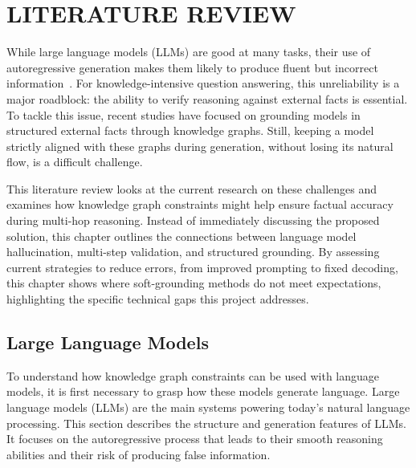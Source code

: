 
\chapter{LITERATURE REVIEW}


While large language models (LLMs) are good at many tasks, their use of autoregressive generation makes them likely to produce fluent but incorrect information~\citep{ji2023survey}. For knowledge-intensive question answering, this unreliability is a major roadblock: the ability to verify reasoning against external facts is essential. To tackle this issue, recent studies have focused on grounding models in structured external facts through knowledge graphs. Still, keeping a model strictly aligned with these graphs during generation, without losing its natural flow, is a difficult challenge.

This literature review looks at the current research on these challenges and examines how knowledge graph constraints might help ensure factual accuracy during multi-hop reasoning. Instead of immediately discussing the proposed solution, this chapter outlines the connections between language model hallucination, multi-step validation, and structured grounding. By assessing current strategies to reduce errors, from improved prompting to fixed decoding, this chapter shows where soft-grounding methods do not meet expectations, highlighting the specific technical gaps this project addresses.


\section{Large Language Models}
\label{sec:llms}

To understand how knowledge graph constraints can be used with language models, it is first necessary to grasp how these models generate language. Large language models (LLMs) are the main systems powering today’s natural language processing. This section describes the structure and generation features of LLMs. It focuses on the autoregressive process that leads to their smooth reasoning abilities and their risk of producing false information.

